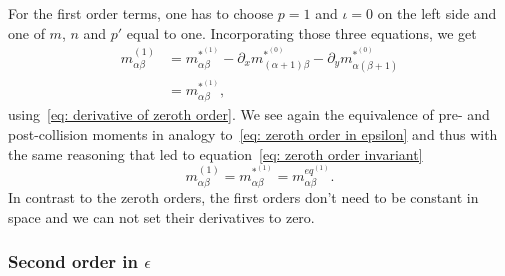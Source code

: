 For the first order terms, one has to choose $p=1$ and $\iota=0$ on the left side and one of $m$, $n$ and $p'$ equal to one.
Incorporating those three equations, we get
\begin{equation}
  \label{eq: first order in epsilon}
  \begin{aligned}
  m_{\alpha\beta}^{(1)}
  & = m_{\alpha\beta}^{*^{(1)}}
  - \partial_x m_{(\alpha+1)\beta}^{*^{(0)}} - \partial_y m_{\alpha(\beta+1)}^{*^{(0)}} \\
  & = m_{\alpha\beta}^{*^{(1)}},
  \end{aligned}
\end{equation}
using~\eqref{eq: derivative of zeroth order}.
We see again the equivalence of pre- and post-collision moments in analogy to~\eqref{eq: zeroth order in epsilon} and thus with the same reasoning that led to equation~\eqref{eq: zeroth order invariant}
\begin{equation}
  \label{eq: first order invariant}
  m_{\alpha\beta}^{(1)} = m_{\alpha\beta}^{*^{(1)}} = m_{\alpha\beta}^{eq^{(1)}}.
\end{equation}
In contrast to the zeroth orders, the first orders don't need to be constant in space and we can not set their derivatives to zero.

\subsubsection{Second order in \texorpdfstring{$\epsilon$}{epsilon}}
\label{subs: Second order in epsilon}

